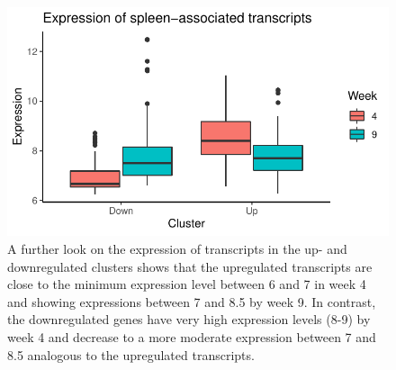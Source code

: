 \documentclass[
]{article}
\begin{document}
\begin{figure}
\centering
\includegraphics{Test2_files/figure-latex/unnamed-chunk-10-1.pdf}
\caption{A further look on the expression of transcripts in the up- and
downregulated clusters shows that the upregulated transcripts are close
to the minimum expression level between 6 and 7 in week 4 and showing
expressions between 7 and 8.5 by week 9. In contrast, the downregulated
genes have very high expression levels (8-9) by week 4 and decrease to a
more moderate expression between 7 and 8.5 analogous to the upregulated
transcripts.}
\end{figure}
\end{document}
